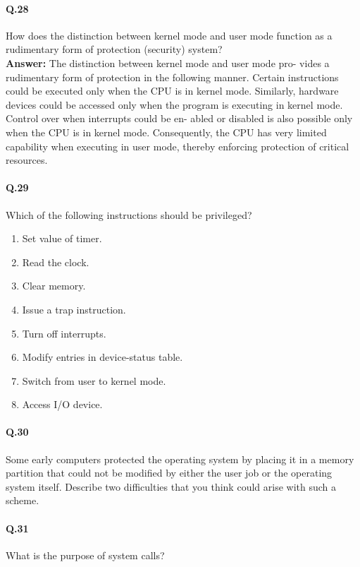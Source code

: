 \documentclass[a4paper,10pt]{article}
\begin{document}
\paragraph{Q.28}
How does the distinction between kernel mode and user mode function
as a rudimentary form of protection (security) system?\\
\textbf{Answer:} The distinction
between kernel mode and user mode pro-
vides a rudimentary form of protection in the following manner. Certain
instructions could be executed only when the CPU is in kernel mode.
Similarly, hardware devices could be accessed only when the program
is executing in kernel mode. Control over when interrupts could be en-
abled or disabled is also possible only when the CPU is in kernel mode.
Consequently, the CPU has very limited capability when executing in
user mode, thereby enforcing protection of critical resources.

\paragraph{Q.29}
Which of the following instructions should be privileged?
\begin{enumerate}
\item Set value of timer.
\item Read the clock.
\item Clear memory.
\item Issue a trap instruction.
\item Turn off interrupts.
\item Modify entries in device-status table.
\item Switch from user to kernel mode.
\item Access I/O device.
 
\end{enumerate}

\paragraph{Q.30}
Some early computers protected the operating system by placing it in
a memory partition that could not be modified by either the user job
or the operating system itself. Describe two difficulties that you think
could arise with such a scheme.


\paragraph{Q.31}
What is the purpose of system calls?
\end{document}
